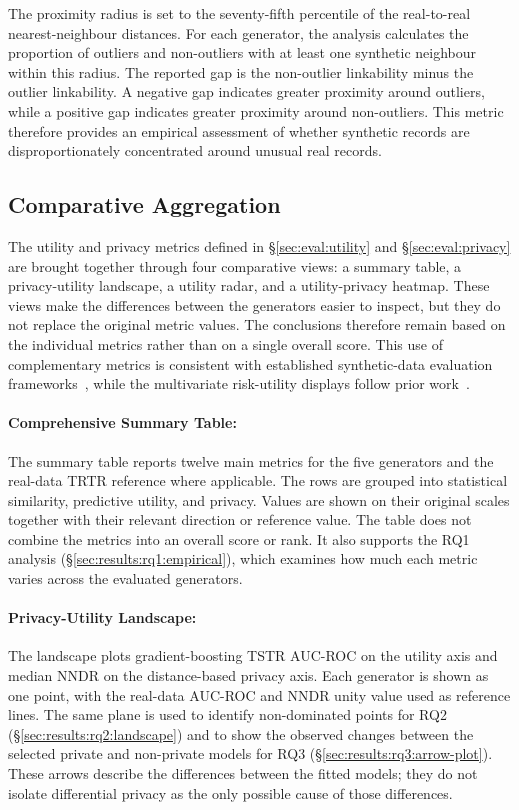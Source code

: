 The proximity radius is set to the seventy-fifth percentile of the
real-to-real nearest-neighbour distances. For each generator, the
analysis calculates the proportion of outliers and non-outliers with at
least one synthetic neighbour within this radius. The reported gap is
the non-outlier linkability minus the outlier linkability. A negative
gap indicates greater proximity around outliers, while a positive gap
indicates greater proximity around non-outliers. This metric therefore
provides an empirical assessment of whether synthetic records are
disproportionately concentrated around unusual real records.

\subsection{Comparative Aggregation}
\label{sec:eval:aggregate}

The utility and privacy metrics defined in \S\ref{sec:eval:utility} and
\S\ref{sec:eval:privacy} are brought together through four comparative
views: a summary table, a privacy-utility landscape, a utility radar,
and a utility-privacy heatmap. These views make the differences between
the generators easier to inspect, but they do not replace the original
metric values. The conclusions therefore remain based on the individual
metrics rather than on a single overall score. This use of complementary
metrics is consistent with established synthetic-data evaluation
frameworks~\cite{hernandez2022synthetic,Murtaza2023,lautrup2025syntheval},
while the multivariate risk-utility displays follow prior
work~\cite{thees2025beyond}.

\paragraph{Comprehensive Summary Table:}
\label{sec:eval:aggregate:table}
The summary table reports twelve main metrics for the five generators
and the real-data TRTR reference where applicable.
The rows are grouped into statistical similarity, predictive utility,
and privacy. Values are shown on their original scales together with
their relevant direction or reference value. The table does not combine
the metrics into an overall score or rank. It also supports the RQ1
analysis (\S\ref{sec:results:rq1:empirical}), which examines how much
each metric varies across the evaluated generators.

\paragraph{Privacy-Utility Landscape:}
\label{sec:eval:aggregate:tradeoff}
The landscape plots gradient-boosting TSTR AUC-ROC on the utility axis
and median NNDR on the distance-based privacy axis. Each generator is
shown as one point, with the real-data AUC-ROC and NNDR unity value used
as reference lines. The same plane is used to identify non-dominated
points for RQ2 (\S\ref{sec:results:rq2:landscape}) and to show the
observed changes between the selected private and non-private models for
RQ3 (\S\ref{sec:results:rq3:arrow-plot}). These arrows describe the
differences between the fitted models; they do not isolate differential
privacy as the only possible cause of those differences.

